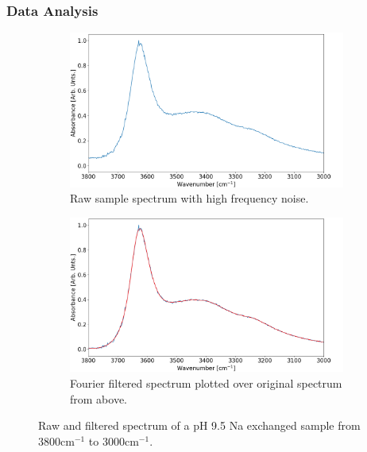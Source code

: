 \subsubsection{Data Analysis}
\begin{figure}
	\centering
	\begin{subfigure}{1\textwidth}
		\centering
		\includegraphics[scale=0.5]{images/raw_spectrum_noise.png}
		\caption{Raw sample spectrum with high frequency noise.}
		\label{fig:spectrum_noise}
	\end{subfigure}\newline
	\begin{subfigure}{1\textwidth}
		\centering
		\includegraphics[scale=0.5]{images/filtered_peaks.png}
		\caption{Fourier filtered spectrum plotted over original spectrum from above.}
		\label{fig:filtered_specctrum}
	\end{subfigure}
	\caption{Raw and filtered spectrum of a pH 9.5 Na exchanged sample from 3800cm$^{-1}$ to 3000cm$^{-1}$.}
	\label{fig:raw_spectrum}
\end{figure}

